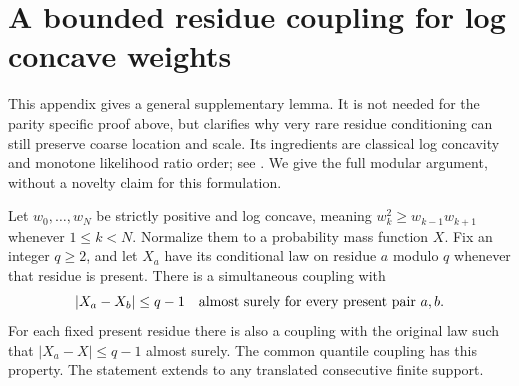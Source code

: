 \section{A bounded residue coupling for log concave weights}\label{spb:ml:sec:coupling}
This appendix gives a general supplementary lemma. It is not needed for the parity specific proof above, but clarifies why very rare residue conditioning can still preserve coarse location and scale. Its ingredients are classical log concavity and monotone likelihood ratio order; see \cite{sw,dm}. We give the full modular argument, without a novelty claim for this formulation.

\begin{theorem}\label{spb:ml:thm:coupling}
Let $w_0,\ldots,w_N$ be strictly positive and log concave, meaning $w_k^2\ge w_{k-1}w_{k+1}$ whenever $1\le k<N$. Normalize them to a probability mass function $X$. Fix an integer $q\ge2$, and let $X_a$ have its conditional law on residue $a$ modulo $q$ whenever that residue is present. There is a simultaneous coupling with
\[
 |X_a-X_b|\le q-1\quad\hbox{almost surely for every present pair }a,b.
\]
For each fixed present residue there is also a coupling with the original law such that $|X_a-X|\le q-1$ almost surely. The common quantile coupling has this property. The statement extends to any translated consecutive finite support.
\end{theorem}
